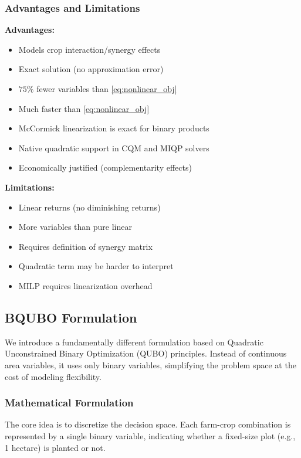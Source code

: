 \documentclass{article}
\begin{document}
\subsubsection{Advantages and Limitations}

\begin{multicols}{2}
    \textbf{Advantages:}
\begin{itemize}
    \item Models crop interaction/synergy effects
    \item Exact solution (no approximation error)
    \item $75\%$ fewer variables than \ref{eq:nonlinear_obj}
    \item Much faster than \ref{eq:nonlinear_obj}
    \item McCormick linearization is exact for binary products
    \item Native quadratic support in CQM and MIQP solvers
    \item Economically justified (complementarity effects)
\end{itemize}
\columnbreak
\textbf{Limitations:}
\begin{itemize}
    \item Linear returns (no diminishing returns)
    \item More variables than pure linear 
    \item Requires definition of synergy matrix
    \item Quadratic term may be harder to interpret
    \item MILP requires linearization overhead
\end{itemize}
\end{multicols}

\newpage
\subsection{BQUBO Formulation }

We introduce a fundamentally different formulation based on Quadratic Unconstrained Binary Optimization (QUBO) principles. Instead of continuous area variables, it uses only binary variables, simplifying the problem space at the cost of modeling flexibility.

\subsubsection{Mathematical Formulation}

The core idea is to discretize the decision space. Each farm-crop combination is represented by a single binary variable, indicating whether a fixed-size plot (e.g., 1 hectare) is planted or not.
\end{document}
